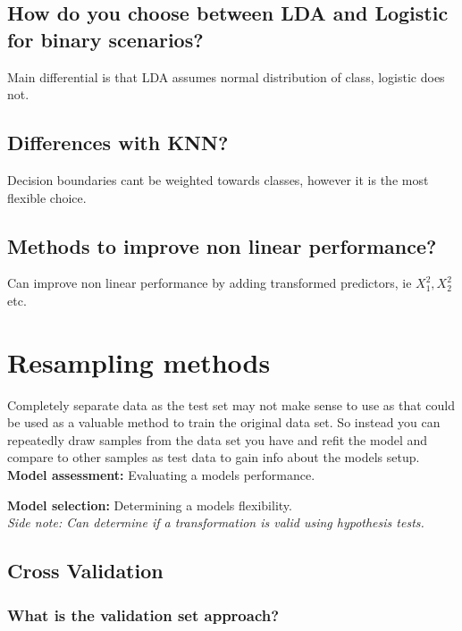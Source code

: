 \documentclass[11pt]{scrartcl} %
\begin{document}
\subsection{How do you choose between LDA and Logistic for binary scenarios?}

Main differential is that LDA assumes normal distribution of class, logistic does not.

\subsection{Differences with KNN?}

Decision boundaries cant be weighted towards classes, however it is the most flexible choice.

\subsection{Methods to improve non linear performance?}

Can improve non linear performance by adding transformed predictors, ie \(X_1^2,X_2^2\) etc.

\section{Resampling methods}

Completely separate data as the test set may not make sense to use as that could be used as
a valuable method to train the original data set. So instead you can repeatedly draw samples
from the data set you have and refit the model and compare to other samples as test data to gain
info about the models setup.\\

\textbf{Model assessment:} Evaluating a models performance.

\textbf{Model selection:} Determining a models flexibility.\\

\textit{Side note: Can determine if a transformation is valid using hypothesis tests.}

\subsection{Cross Validation}

\subsubsection{What is the validation set approach?}
\end{document}
